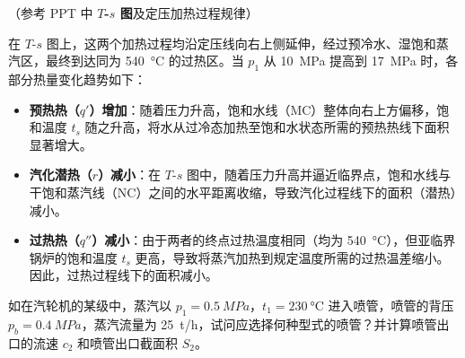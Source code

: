 \begin{solution}
（参考 PPT 中 \textbf{\(T\)-\(s\) 图}及定压加热过程规律）

在 \(T\)-\(s\) 图上，这两个加热过程均沿定压线向右上侧延伸，经过预冷水、湿饱和蒸汽区，最终到达同为 \qty{540}{\degreeCelsius} 的过热区。当 \(p_1\) 从 \qty{10}{MPa} 提高到 \qty{17}{MPa} 时，各部分热量变化趋势如下：

\begin{itemize}
  \item \textbf{预热热（\(q'\)）增加}：随着压力升高，饱和水线（MC）整体向右上方偏移，饱和温度 \(t_s\) 随之升高，将水从过冷态加热至饱和水状态所需的预热热线下面积显著增大。
  \item \textbf{汽化潜热（\(r\)）减小}：在 \(T\)-\(s\) 图中，随着压力升高并逼近临界点，饱和水线与干饱和蒸汽线（NC）之间的水平距离收缩，导致汽化过程线下的面积（潜热）减小。
  \item \textbf{过热热（\(q''\)）减小}：由于两者的终点过热温度相同（均为 \qty{540}{\degreeCelsius}），但亚临界锅炉的饱和温度 \(t_s\) 更高，导致将蒸汽加热到规定温度所需的过热温差缩小。因此，过热过程线下的面积减小。
\end{itemize}
\end{solution}

\begin{problem}
如在汽轮机的某级中，蒸汽以 \(p_1 = \qty{0.5}{MPa}\)，\(t_1 = \qty{230}{\degreeCelsius}\) 进入喷管，喷管的背压 \(p_b = \qty{0.4}{MPa}\)，蒸汽流量为 \qty{25}{t/h}，试问应选择何种型式的喷管？并计算喷管出口的流速 \(c_2\) 和喷管出口截面积 \(S_2\)。
\end{problem}

